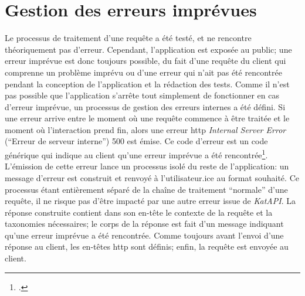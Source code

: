 \section{Gestion des erreurs imprévues}
Le processus de traitement d'une requête a été testé, et ne rencontre théoriquement pas d'erreur. Cependant, l'application est exposée au public; une erreur imprévue est donc toujours possible, du fait d'une requête du client qui comprenne un problème imprévu ou d'une erreur qui n'ait pas été rencontrée pendant la conception de l'application et la rédaction des tests. Comme il n'est pas possible que l'application s'arrête tout simplement de fonctionner en cas d'erreur imprévue, un processus de gestion des erreurs internes a été défini. Si une erreur arrive entre le moment où une requête commence à être traitée et le moment où l'interaction prend fin, alors une erreur \gls{http} \textit{Internal Server Error} (\enquote{Erreur de serveur interne}) 500 est émise. Ce code d'erreur est un code générique qui indique au client qu'une erreur imprévue a été rencontrée\footcite[§15.6.1. 500 \textit{Internal Server Error}]{fielding_http_2022}. L'émission de cette erreur lance un processus isolé du reste de l'application: un message d'erreur est construit et renvoyé à l'utilisateur.ice au format souhaité. Ce processus étant entièrement séparé de la chaîne de traitement \enquote{normale} d'une requête, il ne risque pas d'être impacté par une autre erreur issue de \textit{KatAPI}. La réponse construite contient dans son en-tête le contexte de la requête et la taxonomies nécessaires; le corps de la réponse est fait d'un message indiquant qu'une erreur imprévue a été rencontrée. Comme toujours avant l'envoi d'une réponse au client, les en-têtes \gls{http} sont définis; enfin, la requête est envoyée au client.

